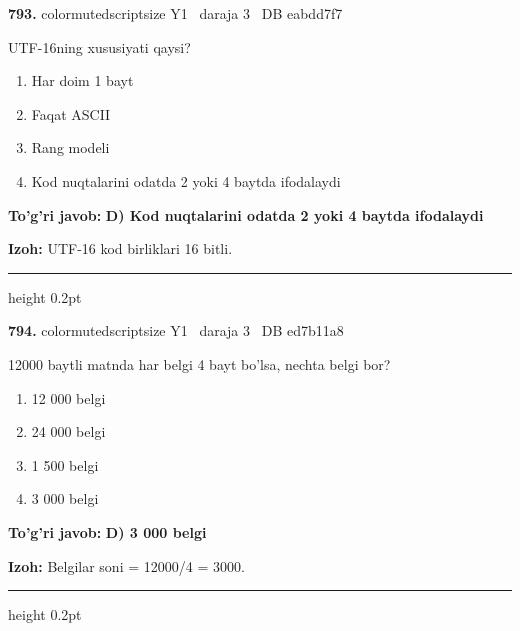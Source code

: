 \documentclass[10pt,a4paper,oneside]{article}
\begin{document}
\noindent\textbf{\color{ink}793.}  {color{muted}scriptsize Y1 \textbullet\ daraja 3 \textbullet\ DB eabdd7f7}
\par
UTF-16ning xususiyati qaysi?
\begin{enumerate}[label=\Alph*),leftmargin=9mm]
\item Har doim 1 bayt
\item Faqat ASCII
\item Rang modeli
\item Kod nuqtalarini odatda 2 yoki 4 baytda ifodalaydi
\end{enumerate}
\begin{tcolorbox}[enhanced,breakable,colback=teal!4,colframe=teal!50!black,boxrule=0.5pt,arc=1.1mm,left=3mm,right=3mm,top=1.7mm,bottom=1.7mm,before skip=2mm,after skip=2mm]
\textbf{\color{teal}To'g'ri javob:} \textbf{D) Kod nuqtalarini odatda 2 yoki 4 baytda ifodalaydi}
\par\smallskip
\textbf{Izoh:} UTF-16 kod birliklari 16 bitli.
\end{tcolorbox}
\vspace{2mm}\hrule height 0.2pt \vspace{3mm}

\noindent\textbf{\color{ink}794.}  {color{muted}scriptsize Y1 \textbullet\ daraja 3 \textbullet\ DB ed7b11a8}
\par
12000 baytli matnda har belgi 4 bayt bo'lsa, nechta belgi bor?
\begin{enumerate}[label=\Alph*),leftmargin=9mm]
\item 12 000 belgi
\item 24 000 belgi
\item 1 500 belgi
\item 3 000 belgi
\end{enumerate}
\begin{tcolorbox}[enhanced,breakable,colback=teal!4,colframe=teal!50!black,boxrule=0.5pt,arc=1.1mm,left=3mm,right=3mm,top=1.7mm,bottom=1.7mm,before skip=2mm,after skip=2mm]
\textbf{\color{teal}To'g'ri javob:} \textbf{D) 3 000 belgi}
\par\smallskip
\textbf{Izoh:} Belgilar soni = 12000/4 = 3000.
\end{tcolorbox}
\vspace{2mm}\hrule height 0.2pt \vspace{3mm}
\end{document}
